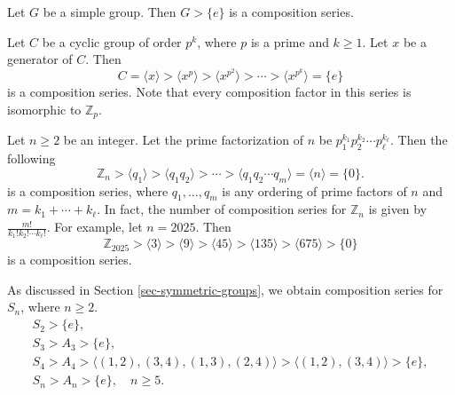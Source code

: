 \begin{example} \label{exp-simple-implies-has-comp-series}
	Let $G$ be a simple group. Then $G>\{e\}$ is a composition series.
\end{example}
\begin{example}
	Let $C$ be a cyclic group of order $p^k$, where $p$ is a prime and $k\geq 1$. Let $x$ be a generator of $C$. Then
	\begin{equation*}
		C = \langle  x\rangle > \langle x^p \rangle > \langle x^{p^2} \rangle > \cdots > \langle x^{p^k}\rangle = \{e\}
	\end{equation*}
	is a composition series. Note that every composition factor in this series is isomorphic to $\mathbb{Z}_p$.
\end{example}
\begin{example}
	Let $n\geq 2$ be an integer. Let the prime factorization of  $n$
	be $p_1^{k_1}p_2^{k_2}\cdots p_\ell^{k_\ell}$. Then the following
	\begin{equation*}
		\mathbb{Z}_n > \langle q_1 \rangle > \langle q_1q_2 \rangle >\cdots > \langle q_1q_2\cdots q_m \rangle = \langle n \rangle = \{0\}.
	\end{equation*}
	is a composition series, where $q_1,\dots, q_m$ is any ordering of prime factors of $n$ and $m = k_1+\cdots+ k_\ell$. In fact, the number of composition series for $\mathbb{Z}_n$ is given by $ \frac{m!}{k_1!k_2!\cdots k_\ell!}$. For example, let $n=2025$. Then
	\begin{equation*}
		\mathbb{Z}_{2025} > \langle 3 \rangle > \langle 9 \rangle > \langle 45 \rangle > \langle 135 \rangle > \langle 675 \rangle > \{0\}
	\end{equation*}
	is a composition series.
\end{example}
\begin{example}
	As discussed in Section \ref{sec-symmetric-groups}, we obtain composition series for $S_n$, where $n\geq 2$.
	\begin{gather*}
		S_2> \{e\},
		\\
		S_3 > A_3 > \{e\},
		\\
		S_4 > A_4 > \langle(1,2),(3,4),(1,3),(2,4)\rangle > \langle(1,2),(3,4)\rangle > \{e\},
		\\
		S_n > A_n> \{e\} ,\quad n\geq 5.
	\end{gather*}
\end{example}
